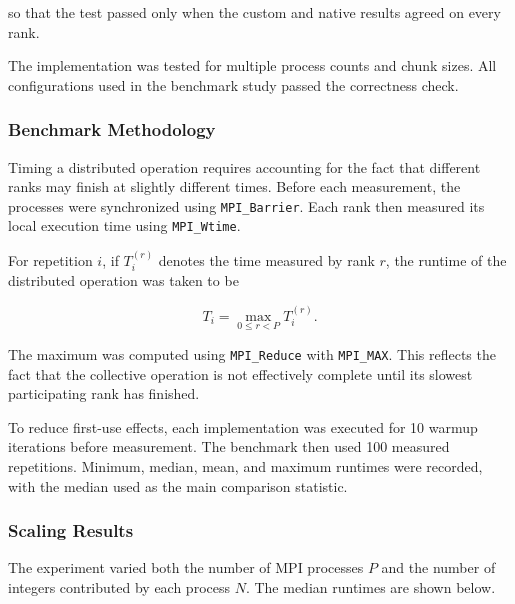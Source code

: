 so that the test passed only when the custom and native results agreed
on every rank.

The implementation was tested for multiple process counts and chunk
sizes. All configurations used in the benchmark study passed the
correctness check.

\subsubsection{Benchmark Methodology}

Timing a distributed operation requires accounting for the fact that
different ranks may finish at slightly different times. Before each
measurement, the processes were synchronized using
\texttt{MPI\_Barrier}. Each rank then measured its local execution time
using \texttt{MPI\_Wtime}.

For repetition $i$, if $T_i^{(r)}$ denotes the time measured by rank
$r$, the runtime of the distributed operation was taken to be

$$
T_i
=
\max_{0\leq r<P} T_i^{(r)}.
$$

The maximum was computed using \texttt{MPI\_Reduce} with
\texttt{MPI\_MAX}. This reflects the fact that the collective operation
is not effectively complete until its slowest participating rank has
finished.

To reduce first-use effects, each implementation was executed for 10
warmup iterations before measurement. The benchmark then used 100
measured repetitions. Minimum, median, mean, and maximum runtimes were
recorded, with the median used as the main comparison statistic.

\subsubsection{Scaling Results}

The experiment varied both the number of MPI processes $P$ and the
number of integers contributed by each process $N$. The median runtimes
are shown below.

